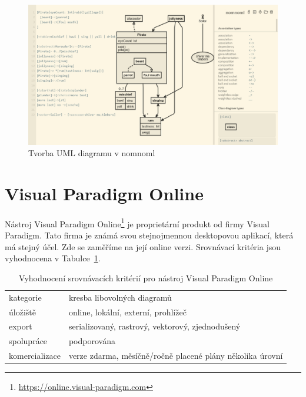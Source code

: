 \begin{figure}[!htb]
  \centering
  \includegraphics[width = \maxwidth{\textwidth}]{../img/nomnoml.png}
  \caption{Tvorba UML diagramu v nomnoml}
  \label{fig:nomnoml}
\end{figure}

\section{Visual Paradigm Online}

Nástroj Visual Paradigm Online\footnote{\url{https://online.visual-paradigm.com}} je proprietární produkt od firmy Visual Paradigm.
Tato firma je známá svou stejnojmennou desktopovou aplikací, která má stejný účel. Zde se zaměříme na její online verzi.
Srovnávací kritéria jsou vyhodnocena v Tabulce~\ref{tab:comparison-vpo}.

\begin{table}[!htb]
  \begin{tabularx}{\textwidth}{lX}\toprule
    kategorie      & kresba libovolných diagramů                                 \\
    úložiště       & online, lokální, externí, prohlížeč                         \\
    export         & serializovaný, rastrový, vektorový, zjednodušený            \\
    spolupráce     & podporována                                                 \\
    komercializace & verze zdarma, měsíčně/ročně placené plány několika úro\-vní
    \\\bottomrule
  \end{tabularx}
  \caption{Vyhodnocení srovnávacích kritérií pro nástroj Visual Paradigm Online}
  \label{tab:comparison-vpo}
\end{table}

